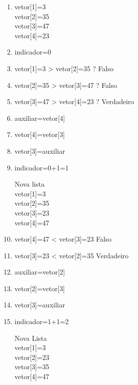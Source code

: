 \documentclass[11pts]{book}
\begin{document}
\begin{enumerate}


\item vetor[1]=3 \\
vetor[2]=35 \\
vetor[3]=47 \\
vetor[4]=23 \\

\item indicador=0

\item vetor[1]=3 > vetor[2]=35 ? Falso

\item vetor[2]=35 > vetor[3]=47 ? Falso

\item vetor[3]=47 > vetor[4]=23 ? Verdadeiro 

\item auxiliar=vetor[4]

\item vetor[4]=vetor[3]

\item vetor[3]=auxiliar

\item  indicador=0+1=1

 Nova lista \\
vetor[1]=3 \\
vetor[2]=35 \\
vetor[3]=23 \\
vetor[4]=47 \\

\item vetor[4]=47 < vetor[3]=23 Falso

\item vetor[3]=23 < vetor[2]=35 Verdadeiro

\item auxiliar=vetor[2]

\item vetor[2]=vetor[3]

\item vetor[3]=auxiliar

\item indicador=1+1=2

 Nova Lista \\

vetor[1]=3 \\
vetor[2]=23\\
vetor[3]=35\\
vetor[4]=47 \\


\end{enumerate}
\end{document}
